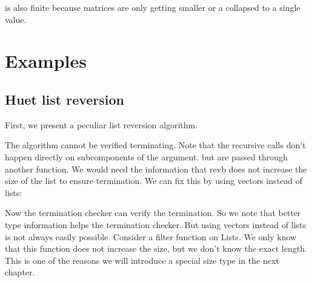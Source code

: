 \begin{definition}
is also finite because matrices are only getting smaller or a collapsed to a single value.
\end{definition}

\section{Examples}


\subsection{Huet list reversion}
First, we present a peculiar list reversion algorithm.

The algorithm cannot be verified terminating.
Note that the recursive calls don't happen directly on subcomponents of the argument.
but are passed through another function.
We would need the information that revb does not increase the size of the list to ensure termination.
We can fix this by using vectors instead of lists:

Now the termination checker can verify the termination.
So we note that better type information helps the termination checker.
But using vectors instead of lists is not always easily possible.
Consider a filter function on Lists. We only know that this function does not increase the size, but
we don't know the exact length.
This is one of the reasons we will introduce a special size type in the next chapter.

